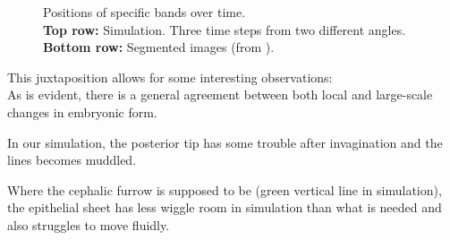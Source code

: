 \begin{figure}[H]
    \centering
\end{figure}
\begin{figure}[H]
    \centering
    \caption{Positions of specific bands over time. \\ \textbf{Top row:} Simulation. Three time steps from two different angles.\\ \textbf{Bottom row:}  Segmented images (from ). \\}
    \label{fig:band-movements-stas}
\end{figure}

This juxtaposition allows for some interesting observations:\\
As is evident, there is a general agreement between both local and large-scale changes in embryonic form. 

In our simulation, the posterior tip has some trouble after invagination and the lines becomes muddled.

Where the cephalic furrow is supposed to be (green vertical line in simulation), the epithelial sheet has less wiggle room in simulation than what is needed and also struggles to move fluidly.





